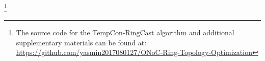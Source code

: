 \documentclass[conference]{IEEEtran}
\begin{document}
\footnote{The source code for the TempCon-RingCast algorithm and additional supplementary materials can be found at: \href{https://github.com/yasmin2017080127/ONoC-Ring-Topology-Optimization}{https://github.com/yasmin2017080127/ONoC-Ring-Topology-Optimization}}

\nocite{*}



\end{document}
